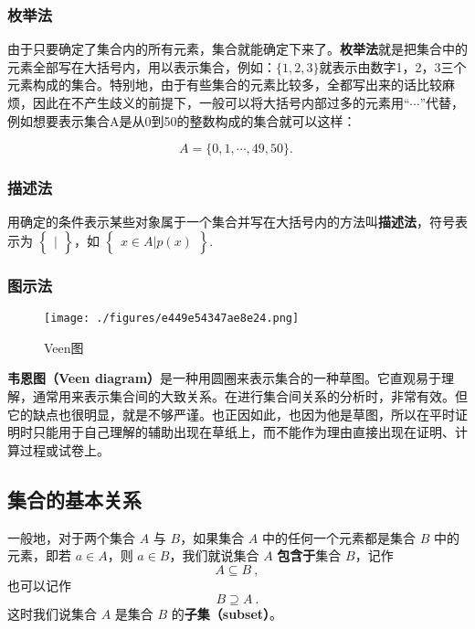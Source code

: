 \subsubsection{枚举法}

由于只要确定了集合内的所有元素，集合就能确定下来了。\textbf{枚举法}就是把集合中的元素全部写在大括号内，用以表示集合，例如：$\{1,2,3\}$就表示由数字1，2，3三个元素构成的集合。特别地，由于有些集合的元素比较多，全都写出来的话比较麻烦，因此在不产生歧义的前提下，一般可以将大括号内部过多的元素用“$\cdots$”代替，例如想要表示集合A是从0到50的整数构成的集合就可以这样：

\begin{equation}
A=\{0,1, \cdots ,49,50\}.~
\end{equation}


\subsubsection{描述法}

用确定的条件表示某些对象属于一个集合并写在大括号内的方法叫\textbf{描述法}，符号表示为 $\begin{Bmatrix} | \end{Bmatrix}$，如 $\begin{Bmatrix} x\in A|p(x) \end{Bmatrix}$.

\subsubsection{图示法}

\begin{figure}[ht]
\centering
\texttt{[image: ./figures/e449e54347ae8e24.png]}
\caption{Veen图} \label{fig_SufCnd_1}
\end{figure}

\textbf{韦恩图（Veen diagram）}是一种用圆圈来表示集合的一种草图。它直观易于理解，通常用来表示集合间的大致关系。在进行集合间关系的分析时，非常有效。但它的缺点也很明显，就是不够严谨。也正因如此，也因为他是草图，所以在平时证明时只能用于自己理解的辅助出现在草纸上，而不能作为理由直接出现在证明、计算过程或试卷上。


\subsection{集合的基本关系}
一般地，对于两个集合 $A$ 与 $B$，如果集合 $A$ 中的任何一个元素都是集合 $B$ 中的元素，即若 $a\in A$，则 $a\in B$，我们就说集合 $A$ \textbf{包含于}集合 $B$，记作
\begin{equation}
A \subseteq B~,
\end{equation}
也可以记作
\begin{equation}
B \supseteq A~.
\end{equation}
这时我们说集合 $A$ 是集合 $B$ 的\textbf{子集（subset）}。

